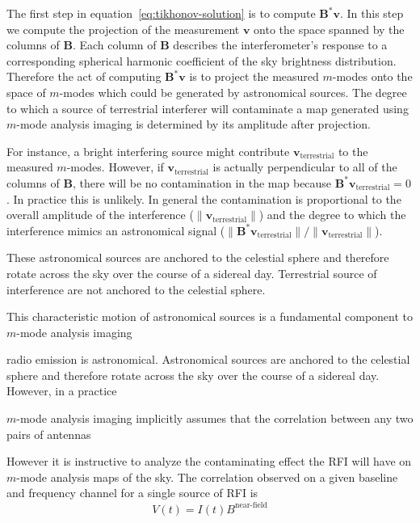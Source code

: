 \documentclass[twocolumn]{aastex6}
\renewcommand{\b}{\pmb}
\begin{document}
The first step in equation~\ref{eq:tikhonov-solution} is to compute $\b B^*\b v$. In this step we
compute the projection of the measurement $\b v$ onto the space spanned by the columns of $\b B$.
Each column of $\b B$ describes the interferometer's response to a corresponding spherical harmonic
coefficient of the sky brightness distribution. Therefore the act of computing $\b B^*\b v$ is to
project the measured $m$-modes onto the space of $m$-modes which could be generated by astronomical
sources. The degree to which a source of terrestrial interferer will contaminate a map generated
using $m$-mode analysis imaging is determined by its amplitude after projection.

For instance, a bright interfering source might contribute $\b v_\text{terrestrial}$ to the measured
$m$-modes. However, if $\b v_\text{terrestrial}$ is actually perpendicular to all of the columns of
$\b B$, there will be no contamination in the map because $\b B^*\b v_\text{terrestrial} = 0$.  In
practice this is unlikely. In general the contamination is proportional to the overall amplitude of
the interference ($\|\b v_\text{terrestrial}\|$) and the degree to which the interference mimics
an astronomical signal ($\|\b B^*\b v_\text{terrestrial}\|/\|\b v_\text{terrestrial}\|$).

















These astronomical sources are anchored to the celestial sphere and therefore rotate
across the sky over the course of a sidereal day. Terrestrial source of interference are not
anchored to the celestial sphere.

This characteristic motion of astronomical sources
is a fundamental component to $m$-mode analysis imaging

radio emission is astronomical. Astronomical sources are anchored to the celestial sphere and
therefore rotate across the sky over the course of a sidereal day. However, in a practice 

$m$-mode analysis imaging implicitly assumes that the correlation between any two pairs of antennas


However it is instructive to analyze the contaminating effect the RFI will have
on $m$-mode analysis maps of the sky. The correlation observed on a given
baseline and frequency channel for a single source of RFI is
\begin{equation}
    V(t) = I(t) B^\textrm{near-field}
\end{equation}
\end{document}
